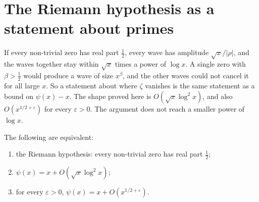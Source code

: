 \section{The Riemann hypothesis as a statement about primes}

If every non-trivial zero has real part $\frac12$, every wave has amplitude $\sqrt x/|\rho|$, and the waves together stay within $\sqrt x$ times a power of $\log x$. A single zero with $\beta>\frac12$ would produce a wave of size $x^\beta$, and the other waves could not cancel it for all large $x$. So a statement about where $\zeta$ vanishes is the same statement as a bound on $\psi(x)-x$. The shape proved here is $O(\sqrt x\log^2x)$, and also $O(x^{1/2+\varepsilon})$ for every $\varepsilon>0$. The argument does not reach a smaller power of $\log x$.

\begin{theorem}\label{thm:rhequiv}
The following are equivalent:
\begin{enumerate}[label=(\alph*)]
\item the Riemann hypothesis: every non-trivial zero has real part $\frac12$;
\item $\psi(x)=x+O(\sqrt x\log^2x)$;
\item for every $\varepsilon>0$, $\psi(x)=x+O(x^{1/2+\varepsilon})$.
\end{enumerate}
\end{theorem}
